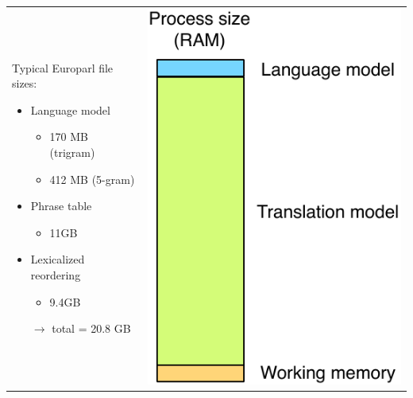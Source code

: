 \documentclass[landscape]{uedslides2C}
\begin{document}
\begin{tabular}{p{10cm}c}
\vspace{-11cm}
Typical Europarl file sizes:
\begin{itemize} \itemsep -1mm
  \item Language model \vspace{-3mm}
	\begin{itemize}
  	\item  170 MB (trigram)
	\item 412 MB (5-gram)
	\end{itemize}
  \item Phrase table \vspace{-3mm}
	\begin{itemize}
  	\item  11GB
	\end{itemize}
  \item Lexicalized reordering \vspace{-3mm}
	\begin{itemize}
  	\item  9.4GB
	\end{itemize}
   \item[$\rightarrow$] total = 20.8 GB
\end{itemize}
&
\includegraphics[scale=1.4]{less-memory-europarl.pdf}
\end{tabular}
\end{document}
